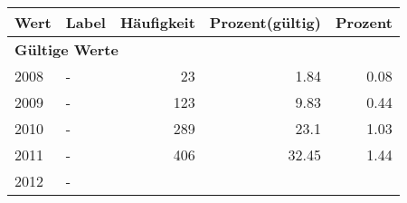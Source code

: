      \begin{longtable}{lXrrr}
     \toprule
     \textbf{Wert} & \textbf{Label} & \textbf{Häufigkeit} & \textbf{Prozent(gültig)} & \textbf{Prozent} \\
     \endhead
     \midrule
     \multicolumn{5}{l}{\textbf{Gültige Werte}}\\

     2008 &
     \multicolumn{1}{X}{ -  } &


       \num{23} &
       \num[round-mode=places,round-precision=2]{1,84} &
         \num[round-mode=places,round-precision=2]{0,08} \\

     2009 &
     \multicolumn{1}{X}{ -  } &


       \num{123} &
       \num[round-mode=places,round-precision=2]{9,83} &
         \num[round-mode=places,round-precision=2]{0,44} \\

     2010 &
     \multicolumn{1}{X}{ -  } &


       \num{289} &
       \num[round-mode=places,round-precision=2]{23,1} &
         \num[round-mode=places,round-precision=2]{1,03} \\

     2011 &
     \multicolumn{1}{X}{ -  } &


       \num{406} &
       \num[round-mode=places,round-precision=2]{32,45} &
         \num[round-mode=places,round-precision=2]{1,44} \\

     2012 &
     \multicolumn{1}{X}{ -  } &



\end{longtable}
